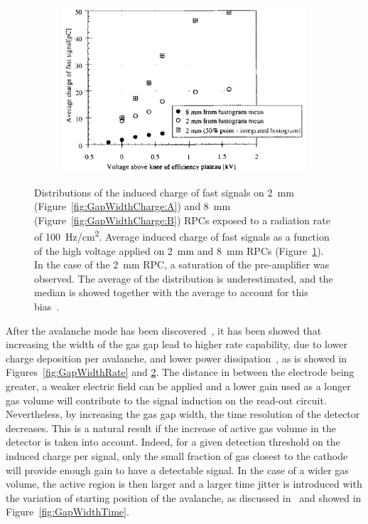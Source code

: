 \begin{figure}[H]
\begin{subfigure}{0.5\linewidth}
		\end{subfigure}
		\begin{subfigure}{\linewidth}
			\centering
			\includegraphics[width = 0.7\plotwidth]{fig/chapt4/Fast-charge-evolution.png}
			\caption{\label{fig:GapWidthCharge:C}}
		\end{subfigure}
		\caption{\label{fig:GapWidthCharge} Distributions of the induced charge of fast signals on \SI{2}{mm} (Figure~\ref{fig:GapWidthCharge:A}) and \SI{8}{mm} (Figure~\ref{fig:GapWidthCharge:B}) RPCs exposed to a radiation rate of \SI{100}{Hz/cm^2}. Average induced charge of fast signals as a function of the high voltage applied on \SI{2}{mm} and \SI{8}{mm} RPCs (Figure~\ref{fig:GapWidthCharge:C}). In the case of the \SI{2}{mm} RPC, a saturation of the pre-amplifier was observed. The average of the distribution is underestimated, and the median is showed together with the average to account for this bias~\cite{ZEBALLOS96COMP}.}
	\end{figure}
	
	After the avalanche mode has been discovered~\cite{CROTTY93}, it has been showed that increasing the width of the gas gap lead to higher rate capability, due to lower charge deposition per avalanche, and lower power dissipation~\cite{ZEBALLOS96COMP}, as is showed in Figures~\ref{fig:GapWidthRate} and \ref{fig:GapWidthCharge}. The distance in between the electrode being greater, a weaker electric field can be applied and a lower gain used as a longer gas volume will contribute to the signal induction on the read-out circuit. Nevertheless, by increasing the gas gap width, the time resolution of the detector decreases. This is a natural result if the increase of active gas volume in the detector is taken into account. Indeed, for a given detection threshold on the induced charge per signal, only the small fraction of gas closest to the cathode will provide enough gain to have a detectable signal. In the case of a wider gas volume, the active region is then larger and a larger time jitter is introduced with the variation of starting position of the avalanche, as discussed in~\cite{ZEBALLOS96MRPC} and showed in Figure~\ref{fig:GapWidthTime}.
	
